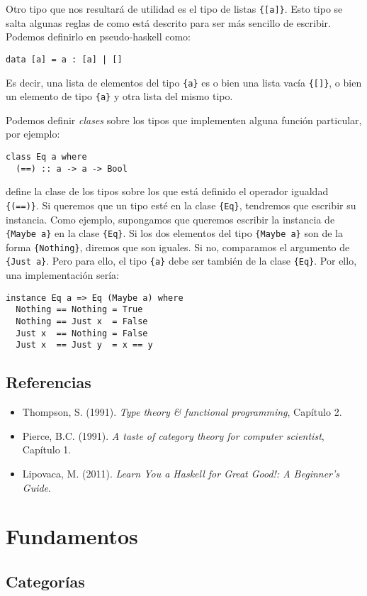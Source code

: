 \documentclass[12pt, twoside]{book}
\newcommand{\code}[1]{\Verb+{#1}+}
\begin{document}
Otro tipo que nos resultará de utilidad es el tipo de listas \code{[a]}.
Esto tipo se salta algunas reglas de como está descrito para ser más sencillo de escribir.
Podemos definirlo en pseudo-haskell como:
\begin{verbatim}
data [a] = a : [a] | []
\end{verbatim}
Es decir, una lista de elementos del tipo \code{a} es o bien una lista vacía \code{[]}, o bien un elemento de tipo \code{a} y otra lista del mismo tipo.

Podemos definir \emph{clases} sobre los tipos que implementen alguna función particular, por ejemplo:
\begin{verbatim}
class Eq a where
  (==) :: a -> a -> Bool
\end{verbatim}
define la clase de los tipos sobre los que está definido el operador igualdad \code{(==)}.
Si queremos que un tipo esté en la clase \code{Eq}, tendremos que escribir su instancia.
Como ejemplo, supongamos que queremos escribir la instancia de \code{Maybe a} en la clase \code{Eq}.
Si los dos elementos del tipo \code{Maybe a} son de la forma \code{Nothing}, diremos que son iguales.
Si no, comparamos el argumento de \code{Just a}.
Pero para ello, el tipo \code{a} debe ser también de la clase \code{Eq}.
Por ello, una implementación sería:
\begin{verbatim}
instance Eq a => Eq (Maybe a) where
  Nothing == Nothing = True
  Nothing == Just x  = False
  Just x  == Nothing = False
  Just x  == Just y  = x == y
\end{verbatim}

\section{Referencias}
\begin{itemize}
  \item Thompson, S. (1991). \emph{Type theory \& functional programming}, Capítulo 2.
  \item Pierce, B.C. (1991). \emph{A taste of category theory for computer scientist}, Capítulo 1.
  \item Lipovaca, M. (2011). \emph{Learn You a Haskell for Great Good!: A Beginner's Guide}.
\end{itemize}
\chapter{Fundamentos}
\section{Categorías}
\end{document}
